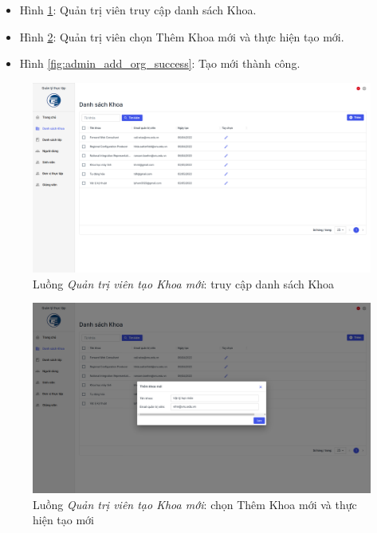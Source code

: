 \documentclass[./../main.tex]{subfiles}
\begin{document}
\begin{itemize}
	\item Hình \ref{fig:admin_access_list_orgs}: Quản trị viên truy cập danh sách Khoa.
	\item Hình \ref{fig:admin_add_org}: Quản trị viên chọn Thêm Khoa mới và thực hiện tạo mới.
	\item Hình \ref{fig:admin_add_org_success}: Tạo mới thành công.
\end{itemize}

\begin{figure}[]
	\includegraphics[width=\linewidth]{./images/image56.png}
	\caption{Luồng \emph{Quản trị viên tạo Khoa mới}: truy cập danh sách Khoa}
	\label{fig:admin_access_list_orgs}
\end{figure}

\begin{figure}[]
	\includegraphics[width=\linewidth]{./images/image57.png}
	\caption{Luồng \emph{Quản trị viên tạo Khoa mới}: chọn Thêm Khoa mới và thực hiện tạo mới}
	\label{fig:admin_add_org}
\end{figure}
\end{document}
